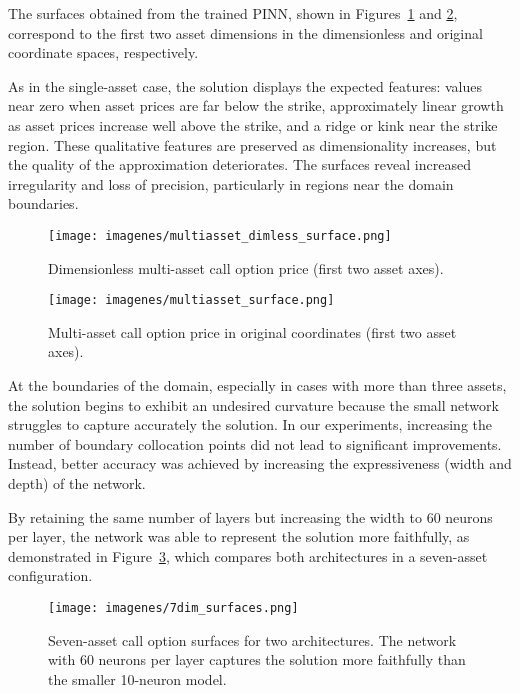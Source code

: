 \documentclass[12pt]{report} %
\theoremstyle{plain} %
\theoremstyle{definition} %
\theoremstyle{remark} %
\begin{document}
The surfaces obtained from the trained PINN, shown in Figures~\ref{fig:multiasset_dimless} 
and \ref{fig:multiasset_surface}, correspond to the first two asset dimensions in the dimensionless 
and original coordinate spaces, respectively. 

As in the single-asset case, the solution displays 
the expected features: values near zero when asset prices are far below the strike, approximately 
linear growth as asset prices increase well above the strike, and a ridge or kink near the strike 
region. These qualitative features are preserved as dimensionality increases, but the quality 
of the approximation deteriorates. The surfaces reveal increased irregularity and loss of precision, 
particularly in regions near the domain boundaries.

\begin{figure}[H]
 \centering
 \texttt{[image: imagenes/multiasset\_dimless\_surface.png]}
 \caption{Dimensionless multi-asset call option price (first two asset axes).}
 \label{fig:multiasset_dimless}
\end{figure}

\begin{figure}[H]
 \centering
 \texttt{[image: imagenes/multiasset\_surface.png]}
 \caption{Multi-asset call option price in original coordinates (first two asset axes).}
 \label{fig:multiasset_surface}
\end{figure}

At the boundaries of the domain, especially in cases with more than three assets, the solution 
begins to exhibit an undesired curvature because the small network struggles to capture accurately the solution. 
In our experiments, increasing the number of boundary collocation points did not lead to 
significant improvements. Instead, better accuracy was achieved by increasing the expressiveness (width and depth)
of the network. 

By retaining the same number of layers but increasing the width to 60 neurons per 
layer, the network was able to represent the solution more faithfully, as demonstrated in 
Figure~\ref{fig:7dim_surfaces}, which compares both architectures in a seven-asset configuration.

\begin{figure}[H]
 \centering
 \texttt{[image: imagenes/7dim\_surfaces.png]}
 \caption{Seven-asset call option surfaces for two architectures. The network with 60 neurons 
	per layer captures the solution more faithfully than the smaller 10-neuron model.}
 \label{fig:7dim_surfaces}
\end{figure}
\end{document}
